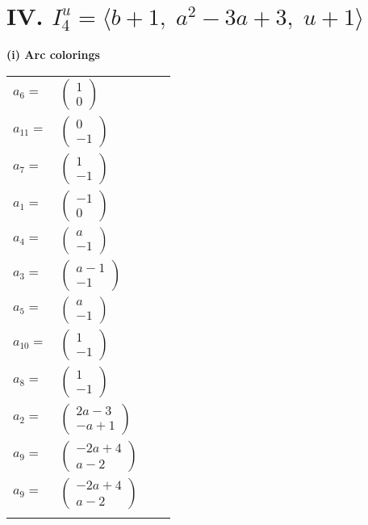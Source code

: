 \documentclass[1p]{elsarticle_modified}
\theoremstyle{definition}
\begin{document}
\centering \section*{IV. $I^u_{4}= \langle b+1,\;a^2-3 a+3,\;u+1 \rangle$}
\flushleft \textbf{(i) Arc colorings}\\
\begin{tabular}{m{7pt} m{180pt} m{7pt} m{180pt} }
\flushright $a_{6}=$&$\begin{pmatrix}1\\0\end{pmatrix}$ \\
\flushright $a_{11}=$&$\begin{pmatrix}0\\-1\end{pmatrix}$ \\
\flushright $a_{7}=$&$\begin{pmatrix}1\\-1\end{pmatrix}$ \\
\flushright $a_{1}=$&$\begin{pmatrix}-1\\0\end{pmatrix}$ \\
\flushright $a_{4}=$&$\begin{pmatrix}a\\-1\end{pmatrix}$ \\
\flushright $a_{3}=$&$\begin{pmatrix}a-1\\-1\end{pmatrix}$ \\
\flushright $a_{5}=$&$\begin{pmatrix}a\\-1\end{pmatrix}$ \\
\flushright $a_{10}=$&$\begin{pmatrix}1\\-1\end{pmatrix}$ \\
\flushright $a_{8}=$&$\begin{pmatrix}1\\-1\end{pmatrix}$ \\
\flushright $a_{2}=$&$\begin{pmatrix}2 a-3\\- a+1\end{pmatrix}$ \\
\flushright $a_{9}=$&$\begin{pmatrix}-2 a+4\\a-2\end{pmatrix}$\\ \flushright $a_{9}=$&$\begin{pmatrix}-2 a+4\\a-2\end{pmatrix}$\\&\end{tabular}
\end{document}
